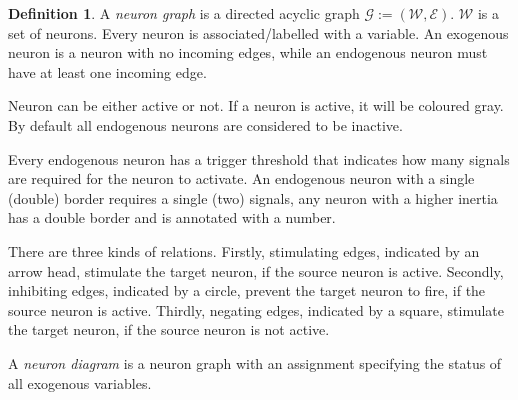 \documentclass[11pt,a4paper]{book}
\theoremstyle{definition}
\newtheorem{definition}{Definition}[section]
\theoremstyle{definition}
\theoremstyle{definition}
\theoremstyle{remark}
\newcommand{\ngraph}{\mathcal{G}}
\newcommand{\cvars}{\mathcal{W}}
\newcommand{\crel}{\mathcal{E}}
\begin{document}
\begin{definition}
\label{def:neuron-diagram}
A \emph{neuron graph} is a directed acyclic graph $\ngraph:=(\cvars, \crel)$. $\cvars$ is a set of neurons. Every neuron is associated/labelled with a variable.
An exogenous neuron is a neuron with no incoming edges, while an endogenous neuron must have at least one incoming edge. 

Neuron can be either active or not. If a neuron is active, it will be coloured gray. By default all endogenous neurons are considered to be inactive.

Every endogenous neuron has a trigger threshold that indicates how many signals are required for the neuron to activate. 
An endogenous neuron with a single (double) border requires a single (two) signals, any neuron with a higher inertia has a double border and is annotated with a number.

There are three kinds of relations. Firstly, stimulating edges, indicated by an arrow head, stimulate the target neuron, if the source neuron is active. 
Secondly, inhibiting edges, indicated by a circle, prevent the target neuron to fire, if the source neuron is active.
Thirdly, negating edges, indicated by a square, stimulate the target neuron, if the source neuron is not active.


A \emph{neuron diagram} is a neuron graph with an assignment specifying the status of all exogenous variables.
\end{definition}
\end{document}
